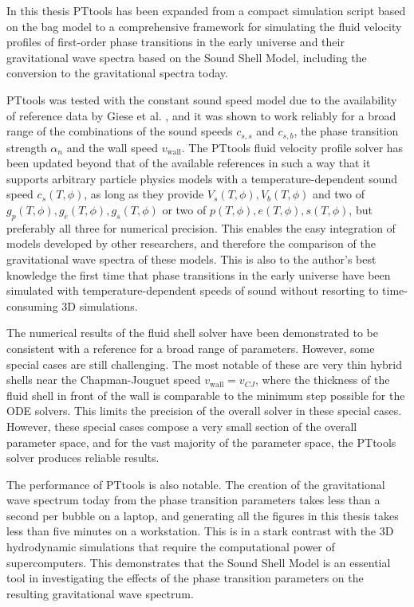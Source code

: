 In this thesis PTtools has been expanded from a compact simulation script based on the bag model
to a comprehensive framework for simulating the fluid velocity profiles of first-order phase transitions in the early universe
and their gravitational wave spectra based on the Sound Shell Model,
including the conversion to the gravitational spectra today.

PTtools was tested with the constant sound speed model due to the availability of reference data by Giese et al. \cite{giese_2021},
and it was shown to work reliably for a broad range of the combinations of the sound speeds $c_{s,s}$ and $c_{s,b}$, the phase transition strength $\alpha_n$ and the wall speed $v_\text{wall}$.
The PTtools fluid velocity profile solver has been updated beyond that of the available references in such a way
that it supports arbitrary particle physics models with a temperature-dependent sound speed $c_s(T,\phi)$,
as long as they provide $V_s(T,\phi), V_b(T,\phi)$ and two of $g_p(T,\phi), g_e(T,\phi), g_s(T,\phi)$ or two of $p(T,\phi), e(T,\phi), s(T,\phi)$, but preferably all three for numerical precision.
This enables the easy integration of models developed by other researchers,
and therefore the comparison of the gravitational wave spectra of these models.
This is also to the author's best knowledge the first time that phase transitions in the early universe have been simulated with temperature-dependent speeds of sound without resorting to time-consuming 3D simulations.

The numerical results of the fluid shell solver have been demonstrated to be consistent with a reference
for a broad range of parameters.
However, some special cases are still challenging.
The most notable of these are very thin hybrid shells near the Chapman-Jouguet speed $v_\text{wall} = v_{CJ}$,
where the thickness of the fluid shell in front of the wall is comparable to the minimum step possible for the ODE solvers.
This limits the precision of the overall solver in these special cases.
However, these special cases compose a very small section of the overall parameter space,
and for the vast majority of the parameter space,
the PTtools solver produces reliable results.

The performance of PTtools is also notable.
The creation of the gravitational wave spectrum today from the phase transition parameters takes less than a second per bubble on a laptop,
and generating all the figures in this thesis takes less than five minutes on a workstation.
This is in a stark contrast with the 3D hydrodynamic simulations that require the computational power of supercomputers.
This demonstrates that the Sound Shell Model is an essential tool in investigating
the effects of the phase transition parameters on the resulting gravitational wave spectrum.

